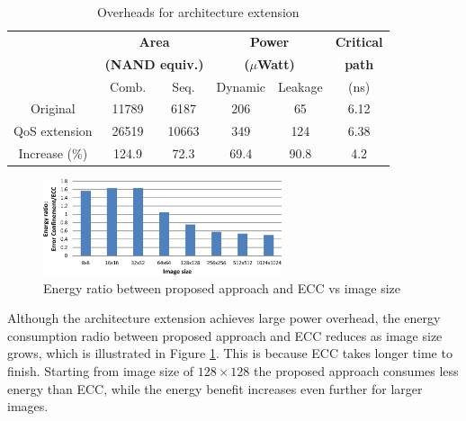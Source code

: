 \begin{table}[hbt]
\begin{center}
\caption{Overheads for architecture extension}
    \label{tab:qos_overhead}
\begin{tabular}{|c|c|c|c|c|c|}\hline 
                 & \multicolumn{2}{c|}{\textbf{Area}} & \multicolumn{2}{c|}{\textbf{Power}} & \textbf{Critical} \\ 
                 & \multicolumn{2}{c|}{\textbf{(NAND equiv.)}} & \multicolumn{2}{c|}{\textbf{($\mu$Watt)}} & \textbf{path} \\ \cline{2-5}
                 & Comb. & Seq. & Dynamic & Leakage & (ns) \\\hline
Original          & 11789         & 6187       & 206     & 65      & 6.12 \\\hline
QoS extension     & 26519         & 10663      & 349     & 124     & 6.38 \\\hline
Increase (\%)     & 124.9         & 72.3       & 69.4    & 90.8    & 4.2  \\\hline
\end{tabular}
\vspace{-4mm}
\end{center}
\end{table}

\begin{figure}[hbt]
\centering
\includegraphics[width=70mm]{./eps/qos_energy}
\caption{Energy ratio between proposed approach and ECC vs image size}
\vspace{-4mm}
\label{fig:qos_energy}
\end{figure}

Although the architecture extension achieves large power overhead, the energy consumption radio between proposed approach and ECC reduces as image size grows, which is illustrated in Figure \ref{fig:qos_energy}. This is because ECC takes longer time to finish. Starting from image size of $128 \times 128$ the proposed approach consumes less energy than ECC, while the energy benefit increases even further for larger images.

